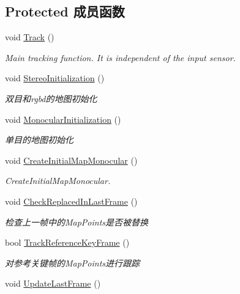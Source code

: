 \subsection*{Protected 成员函数}
\begin{DoxyCompactItemize}
\item 
void \hyperlink{classORB__SLAM2_1_1Tracking_af1f2c9c533642d8c33854540e90d1918}{Track} ()
\begin{DoxyCompactList}\small\item\em Main tracking function. It is independent of the input sensor. \end{DoxyCompactList}\item 
void \hyperlink{classORB__SLAM2_1_1Tracking_ad3da849e4204d766e5db4ac47b52132c}{Stereo\-Initialization} ()
\begin{DoxyCompactList}\small\item\em 双目和rgbd的地图初始化 \end{DoxyCompactList}\item 
void \hyperlink{classORB__SLAM2_1_1Tracking_a7e81c68bb6ced27fcbfa2edec38ef6e0}{Monocular\-Initialization} ()
\begin{DoxyCompactList}\small\item\em 单目的地图初始化 \end{DoxyCompactList}\item 
void \hyperlink{classORB__SLAM2_1_1Tracking_afeb077c81cd700d779348b80698086e8}{Create\-Initial\-Map\-Monocular} ()
\begin{DoxyCompactList}\small\item\em Create\-Initial\-Map\-Monocular. \end{DoxyCompactList}\item 
void \hyperlink{classORB__SLAM2_1_1Tracking_a2ca003d3234b2e8444f70dcd2132126f}{Check\-Replaced\-In\-Last\-Frame} ()
\begin{DoxyCompactList}\small\item\em 检查上一帧中的\-Map\-Points是否被替换 \end{DoxyCompactList}\item 
bool \hyperlink{classORB__SLAM2_1_1Tracking_a737c5409c93844353561a0fe724ed1c2}{Track\-Reference\-Key\-Frame} ()
\begin{DoxyCompactList}\small\item\em 对参考关键帧的\-Map\-Points进行跟踪 \end{DoxyCompactList}\item 
void \hyperlink{classORB__SLAM2_1_1Tracking_aa84a20277d5bd022b527d79a58830bc5}{Update\-Last\-Frame} ()

\end{DoxyCompactItemize}
